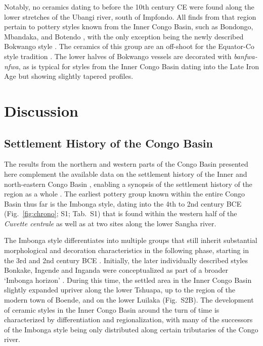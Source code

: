 \documentclass[smallextended,natbib]{svjour3}       %
\begin{document}
Notably, no ceramics dating to before the 10th century CE were found along the lower stretches of the Ubangi river, south of Impfondo. All finds from that region pertain to pottery styles known from the Inner Congo Basin, such as Bondongo, Mbandaka, and Botendo \citep[Fig.~\ref{fig:ubangi}.14--16,25;][172--181]{Seidensticker.2021e}, with the only exception being the newly described Bokwango style \citep[Fig.~\ref{fig:ubangi}.17--18;][96--99]{Seidensticker.2021e}. The ceramics of this group are an off-shoot for the Equator-Co style tradition \citep{Wotzka.1995}. The lower halves of Bokwango vessels are decorated with \textit{banfwa-nfwa}, as is typical for styles from the Inner Congo Basin dating into the Late Iron Age but showing slightly tapered profiles.

\section*{Discussion}

\subsection*{Settlement History of the Congo Basin}

The results from the northern and western parts of the Congo Basin presented here complement the available data on the settlement history of the Inner \citep{Wotzka.1995} and north-eastern Congo Basin \citep{LivingstoneSmith.2017}, enabling a synopsis of the settlement history of the region as a whole \citep[218--244]{Seidensticker.2021e}. The earliest pottery group known within the entire Congo Basin thus far is the Imbonga style, dating into the 4th to 2nd century BCE (Fig.~\ref{fig:chrono}; S1; Tab.~S1) that is found within the western half of the \textit{Cuvette centrale} \citep[Fig.~\ref{fig:timeslices_1_eia}A;][59--68]{Wotzka.1995} as well as at two sites along the lower Sangha river.

The Imbonga style differentiates into multiple groups that still inherit substantial morphological and decoration characteristics in the following phase, starting in the 3rd and 2nd century BCE \citep[219--224]{Seidensticker.2021e}. Initially, the later individually described styles Bonkake, Ingende and Inganda \citep[Fig.~\ref{fig:chrono}; S1; Tab.~S1;][68--84]{Wotzka.1995} were conceptualized as part of a broader ‘Imbonga horizon’ \citep{Eggert.1983}. During this time, the settled area in the Inner Congo Basin slightly expanded upriver along the lower Tshuapa, up to the region of the modern town of Boende, and on the lower Luilaka (Fig.~S2B). The development of ceramic styles in the Inner Congo Basin around the turn of time is characterized by differentiation and regionalization, with many of the successors of the Imbonga style being only distributed along certain tributaries of the Congo river.
\end{document}
